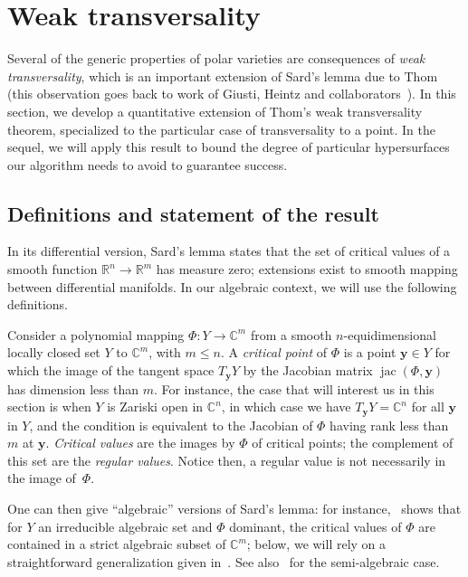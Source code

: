 \documentclass[12pt]{article}
\DeclareMathOperator{\jac}{jac}
\def\C{\mathbb{C}}
\def\R{\mathbb{R}}
\begin{document}
\section{Weak transversality}

Several of the generic properties of polar varieties are consequences
of {\em weak transversality}, which is an important extension of
Sard's lemma due to Thom (this observation goes back to work of
Giusti, Heintz and collaborators~\cite{BaGiHeMb97,BaGiHeLePa12}).  In
this section, we develop a quantitative extension of Thom's weak
transversality theorem, specialized to the particular case of
transversality to a point. In the sequel, we will apply this result to
bound the degree of particular hypersurfaces our algorithm needs to
avoid to guarantee success.


\subsection{Definitions and statement of the result}

In its differential version, Sard's lemma states that the set of
critical values of a smooth function $\R^n \to \R^m$ has measure zero;
extensions exist to smooth mapping between differential manifolds.  In
our algebraic context, we will use the following definitions.

Consider a polynomial mapping $\Phi : Y \rightarrow \C^m$ from a
smooth $n$-equidimensional locally closed set $Y$ to $\C^m$, with
$m\le n$. A {\em critical point} of $\Phi$ is a point $\bm y \in Y$
for which the image of the tangent space $T_{\bm y} Y$ by the Jacobian
matrix $\jac(\Phi,\bm y)$ has dimension less than $m$. For instance,
the case that will interest us in this section is when $Y$ is Zariski
open in $\C^n$, in which case we have $T_{\bm y} Y=\C^n$ for all $\bm
y$ in $Y$, and the condition is equivalent to the Jacobian of $\Phi$
having rank less than $m$ at $\bm y$. {\em Critical values} are the
images by $\Phi$ of critical points; the complement of this set are
the {\em regular values}. Notice then, a regular value is not
necessarily in the image of~$\Phi$.

One can then give ``algebraic'' versions of Sard's lemma: for
instance,~\cite[(3.7)]{Mumford76} shows that for $Y$ an irreducible
algebraic set and $\Phi$ dominant, the critical values of $\Phi$ are
contained in a strict algebraic subset of $\C^m$; below, we will rely
on a straightforward generalization given in~\cite{TWT}. See
also~\cite[Chapter~9]{bochnak1998real} for the semi-algebraic case.
\end{document}
